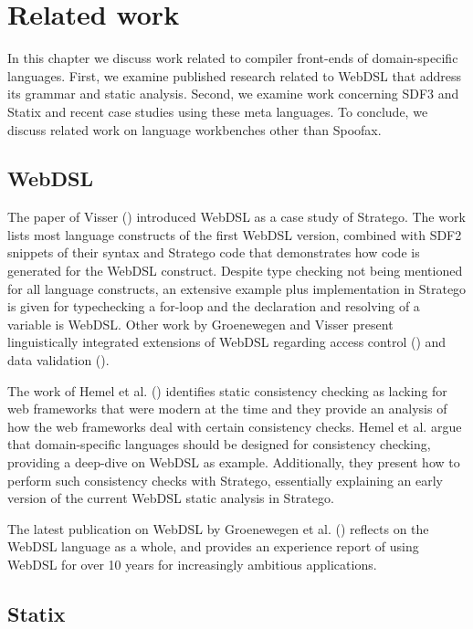 
\chapter{\label{chap:related-work}Related work}

  In this chapter we discuss work related to compiler front-ends of domain-specific languages. First, we examine published research related to WebDSL that address its grammar and static analysis. Second, we examine work concerning SDF3 and Statix and recent case studies using these meta languages. To conclude, we discuss related work on language workbenches other than Spoofax.

  \section{WebDSL}

    The paper of Visser (\citeyear{Visser2007}) introduced WebDSL as a case study of Stratego. The work lists most language constructs of the first WebDSL version, combined with SDF2 snippets of their syntax and Stratego code that demonstrates how code is generated for the WebDSL construct. Despite type checking not being mentioned for all language constructs, an extensive example plus implementation in Stratego is given for typechecking a for-loop and the declaration and resolving of a variable is WebDSL. Other work by Groenewegen and Visser present linguistically integrated extensions of WebDSL regarding access control (\citeyear{GroenewegenV08}) and data validation (\citeyear{GroenewegenV13}).

    The work of Hemel et al. (\citeyear{Hemel2011}) identifies static consistency checking as lacking for web frameworks that were modern at the time and they provide an analysis of how the web frameworks deal with certain consistency checks. Hemel et al. argue that domain-specific languages should be designed for consistency checking, providing a deep-dive on WebDSL as example. Additionally, they present how to perform such consistency checks with Stratego, essentially explaining an early version of the current WebDSL static analysis in Stratego.

    The latest publication on WebDSL by Groenewegen et al. (\citeyear{Groenewegen2020}) reflects on the WebDSL language as a whole, and provides an experience report of using WebDSL for over 10 years for increasingly ambitious applications.

  \section{Statix}

